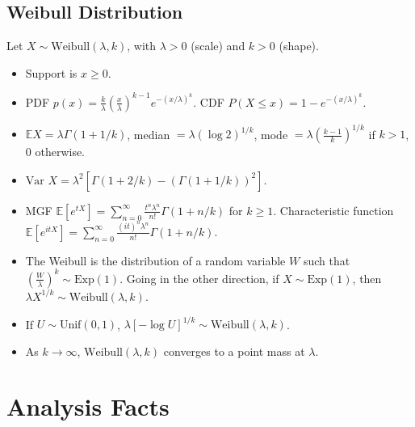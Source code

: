 \documentclass[twoside]{article}
\newcommand\bbE{\mathbb{E}}
\newcommand\lmb{\lambda}
\newcommand\goesto{\rightarrow}
\newcommand\var{\text{Var }}
\begin{document}
\subsection{Weibull Distribution}
Let $X \sim \text{Weibull}(\lmb, k)$, with $\lmb > 0$ (scale) and $k > 0$ (shape).

\begin{itemize}
\item Support is $x \geq 0$.

\item PDF $p(x) = \displaystyle\frac{k}{\lmb}\left( \frac{x}{\lmb}\right)^{k-1} e^{-(x/\lmb)^k}$. CDF $P (X \leq x) = 1 - e^{-(x/\lmb)^k}$.

\item $\bbE X = \lmb \Gamma(1 + 1/k)$, median $= \lmb \left( \log 2 \right)^{1/k}$, mode $= \lmb \left( \displaystyle\frac{k-1}{k} \right)^{1/k}$ if $k > 1$, 0 otherwise.

\item $\var X = \lmb^2 \left[ \Gamma(1 + 2/k) - (\Gamma (1 + 1/k))^2 \right]$.

\item MGF $\bbE [e^{tX}] = \displaystyle\sum_{n=0}^\infty\frac{t^n \lmb^n}{n!} \Gamma (1 + n/k)$ for $k \geq 1$. Characteristic function $\bbE [e^{itX}] = \displaystyle\sum_{n=0}^\infty\frac{(it)^n \lmb^n}{n!} \Gamma (1 + n/k)$.

\item The Weibull is the distribution of a random variable $W$ such that $\left( \displaystyle\frac{W}{\lmb}\right)^k \sim \text{Exp}(1)$. Going in the other direction, if $X \sim \text{Exp}(1)$, then $\lmb X^{1/k} \sim \text{Weibull}(\lmb, k)$.

\item If $U \sim \text{Unif}(0,1)$, $\lmb [- \log U]^{1/k} \sim \text{Weibull}(\lmb, k)$.

\item As $k \goesto \infty$, $\text{Weibull}(\lmb, k)$ converges to a point mass at $\lmb$.
\end{itemize}

\section{Analysis Facts}
\end{document}
